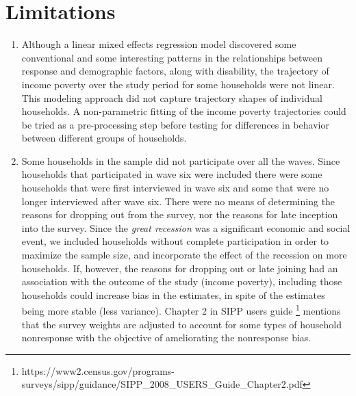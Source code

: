 \documentclass[11pt]{extarticle} %
\begin{document}
\section*{Limitations}
\begin{enumerate}
\item Although a linear mixed effects regression model discovered some conventional and some interesting patterns in the relationships between response and demographic factors, along with disability, the trajectory of income poverty over the study period for some households were not linear. This modeling approach did not capture trajectory shapes of individual households. A non-parametric fitting of the income poverty trajectories could be tried as a pre-processing step before testing for differences in behavior between different groups of households. 

\item Some households in the sample did not participate over all the waves. Since households that participated in wave six were included there were some households that were first interviewed in wave six and some that were no longer interviewed after wave six. There were no means of determining the reasons for dropping out from the survey, nor the reasons for late inception into the survey. Since the {\emph{great recession}} was a significant economic and social event, we included households without complete participation in order to maximize the sample size, and incorporate the effect of the recession on more households. If, however, the reasons for dropping out or late joining had an association with the outcome of the study (income poverty), including those households could increase bias in the estimates, in spite of the estimates being more stable (less variance). Chapter 2 in SIPP users guide \footnote{https://www2.census.gov/programs-surveys/sipp/guidance/SIPP\_2008\_USERS\_Guide\_Chapter2.pdf} mentions that the survey weights are adjusted to account for some types of household nonresponse with the objective of ameliorating the nonresponse bias. 
\end{enumerate}



\newpage




\newpage

\end{document}
